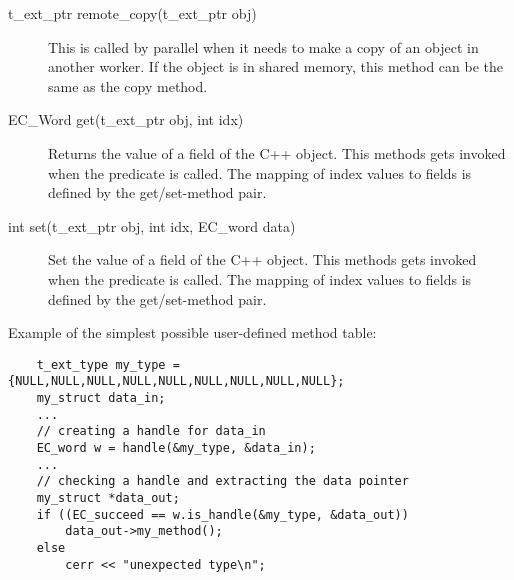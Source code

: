 \begin{description}
\item[t_ext_ptr remote_copy(t_ext_ptr obj)]
This is called by parallel {\eclipse} when it needs to make a copy of an
object in another worker. If the object is in shared memory, this method
can be the same as the copy method.

\item[EC_Word get(t_ext_ptr obj, int idx)]
Returns the value of a field of the C++ object.
This methods gets invoked when the {\eclipse} predicate  is called.
The mapping of index values to fields is defined by the get/set-method pair.

\item[int set(t_ext_ptr obj, int idx, EC_word data)]
Set the value of a field of the C++ object.
This methods gets invoked when the {\eclipse} predicate  is called.
The mapping of index values to fields is defined by the get/set-method pair.
\end{description}

Example of the simplest possible user-defined method table:
\begin{verbatim}
    t_ext_type my_type = {NULL,NULL,NULL,NULL,NULL,NULL,NULL,NULL,NULL};
    my_struct data_in;
    ...
    // creating a handle for data_in
    EC_word w = handle(&my_type, &data_in);
    ...
    // checking a handle and extracting the data pointer
    my_struct *data_out;
    if ((EC_succeed == w.is_handle(&my_type, &data_out))
        data_out->my_method();
    else
        cerr << "unexpected type\n";
\end{verbatim}




